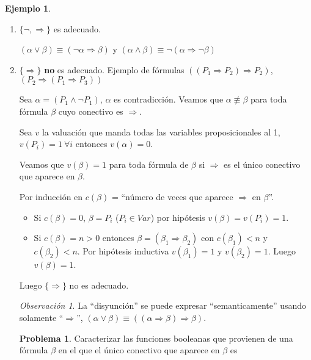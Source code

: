\documentclass[a4paper,11pt]{article}
\theoremstyle{definition}
\newtheorem{exap}{Ejemplo}[section]
\newtheorem*{prob}{Problema}
\theoremstyle{remark}
\newtheorem*{remk}{Observación}
\begin{document}
\begin{exap}
\begin{enumerate}[label=\emph{\alph*})]
\item $\{\neg, \Rightarrow\}$ es adecuado. 

$(\alpha \vee \beta) \equiv (\neg\alpha \Rightarrow \beta)$ y 
$(\alpha \wedge \beta) \equiv \neg(\alpha \Rightarrow \neg\beta)$

\item $\{\Rightarrow\}$ \textbf{no} es adecuado. Ejemplo de fórmulas
$((P_1 \Rightarrow P_2) \Rightarrow P_2)$, 
$(P_2 \Rightarrow (P_1 \Rightarrow P_3))$

Sea $\alpha = (P_1 \wedge \neg P_1)$, $\alpha$ es contradicción. Veamos
que $\alpha \not\equiv \beta$ para toda fórmula $\beta$ cuyo conectivo es
$\Rightarrow$.

Sea $v$ la valuación que manda todas las variables proposicionales al 1,
$v(P_i) = 1\  \forall i$ entonces $v(\alpha) = 0$.

Veamos que $v(\beta) = 1$ para toda fórmula de $\beta$ si $\Rightarrow$
es el único conectivo que aparece en $\beta$.

Por inducción en $c(\beta)$ = ``número de veces que aparece $\Rightarrow$
en $\beta$''.

\begin{itemize}
\item Si $c(\beta) = 0$, $\beta = P_i$ ($P_i \in Var$) por hipótesis
$v(\beta) = v(P_i) = 1$.

\item Si $c(\beta) = n > 0$ entonces $\beta = (\beta_1 \Rightarrow \beta_2)$
con $c(\beta_1) < n$ y $c(\beta_2) < n$. Por hipótesis inductiva
$v(\beta_1) = 1$ y $v(\beta_2) = 1$. Luego $v(\beta) = 1$.
\end{itemize}

Luego $\{\Rightarrow\}$ no es adecuado.

\begin{remk}
La ``disyunción'' se puede expresar ``semanticamente'' usando solamente
``$\Rightarrow$'', $(\alpha \vee \beta) \equiv 
((\alpha \Rightarrow \beta) \Rightarrow \beta)$.
\end{remk}

\begin{prob}
Caracterizar las funciones booleanas que provienen de una fórmula $\beta$
en el que el único conectivo que aparece en $\beta$ es


\end{prob}
\end{enumerate}
\end{exap}
\end{document}
